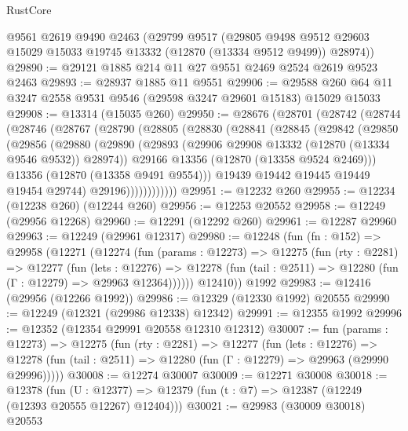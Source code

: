 \begin{lexlean}{RustCore}
\begin{coremodule}
    @9561
    @2619
    @9490
    @2463
    (@29799
      @9517
      (@29805 @9498 @9512 @29603 @15029 @15033 @19745 @13332 (@12870 (@13334 @9512 @9499)) @28974))
@29890 := @29121 @1885 @214 @11 @27 @9551 @2469 @2524 @2619 @9523 @2463
@29893 := @28937 @1885 @11 @9551
@29906 := @29588 @260 @64 @11 @3247 @2558 @9531 @9546 (@29598 @3247 @29601 @15183) @15029 @15033
@29908 := @13314 (@15035 @260)
@29950 := @28676
    (@28701
      (@28742
        (@28744
          (@28746
            (@28767
              (@28790
                (@28805
                  (@28830
                    (@28841
                      (@28845
                        (@29842
                          (@29850
                            (@29856
                              (@29880
                                (@29890
                                  (@29893
                                    (@29906 @29908 @13332 (@12870 (@13334 @9546 @9532)) @28974))
                                  @29166
                                  @13356
                                  (@12870 (@13358 @9524 @2469)))
                                @13356
                                (@12870 (@13358 @9491 @9554)))
                              @19439
                              @19442
                              @19445
                              @19449
                              @19454
                              @29744)
                            @29196))))))))))))
@29951 := @12232 @260
@29955 := @12234 (@12238 @260) (@12244 @260)
@29956 := @12253 @20552
@29958 := @12249 (@29956 @12268)
@29960 := @12291 (@12292 @260)
@29961 := @12287 @29960
@29963 := @12249 (@29961 @12317)
@29980 := @12248
    (fun (fn : @152) =>
    @29958
      (@12271
        (@12274
          (fun (params : @12273) =>
          @12275
            (fun (rty : @2281) =>
            @12277
              (fun (lets : @12276) =>
              @12278 (fun (tail : @2511) => @12280 (fun (Γ : @12279) => @29963 @12364))))))
        @12410))
    @1992
@29983 := @12416 (@29956 (@12266 @1992))
@29986 := @12329 (@12330 @1992) @20555
@29990 := @12249 (@12321 (@29986 @12338) @12342)
@29991 := @12355 @1992
@29996 := @12352 (@12354 @29991 @20558 @12310 @12312)
@30007 := fun (params : @12273) =>
  @12275
    (fun (rty : @2281) =>
    @12277
      (fun (lets : @12276) =>
      @12278 (fun (tail : @2511) => @12280 (fun (Γ : @12279) => @29963 (@29990 @29996)))))
@30008 := @12274 @30007
@30009 := @12271 @30008
@30018 := @12378
    (fun (U : @12377) => @12379 (fun (t : @7) => @12387 (@12249 (@12393 @20555 @12267) @12404)))
@30021 := @29983 (@30009 @30018) @20553

\end{coremodule}
\end{lexlean}
